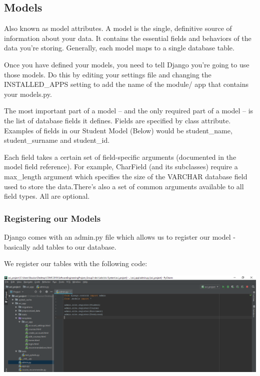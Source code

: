 \documentclass[10pt]{article}
\begin{document}
\subsection{Models}

Also known as model attributes. A model is the single, definitive source of information about your data. It contains the essential fields and behaviors of the data you’re storing. Generally, each model maps to a single database table.

Once you have defined your models, you need to tell Django you’re going to use those models. Do this by editing your settings file and changing the INSTALLED\_APPS setting to add the name of the module/ app that contains your models.py.

The most important part of a model – and the only required part of a model – is the list of database fields it defines. Fields are specified by class attribute. Examples of fields in our Student Model (Below) would be student\_name, student\_surname and student\_id.

Each field takes a certain set of field-specific arguments (documented in the model field reference). For example, CharField (and its subclasses) require a max\_length argument which specifies the size of the VARCHAR database field used to store the data.There’s also a set of common arguments available to all field types. All are optional.

\subsubsection{Registering our Models}
Django comes with an admin.py file which allows us to register our model - basically add tables to our database.

We register our tables with the following code:

\begin{center}
\includegraphics[width=1.1\textwidth]{p1.png}
\end{center} \\ \\
\end{document}
